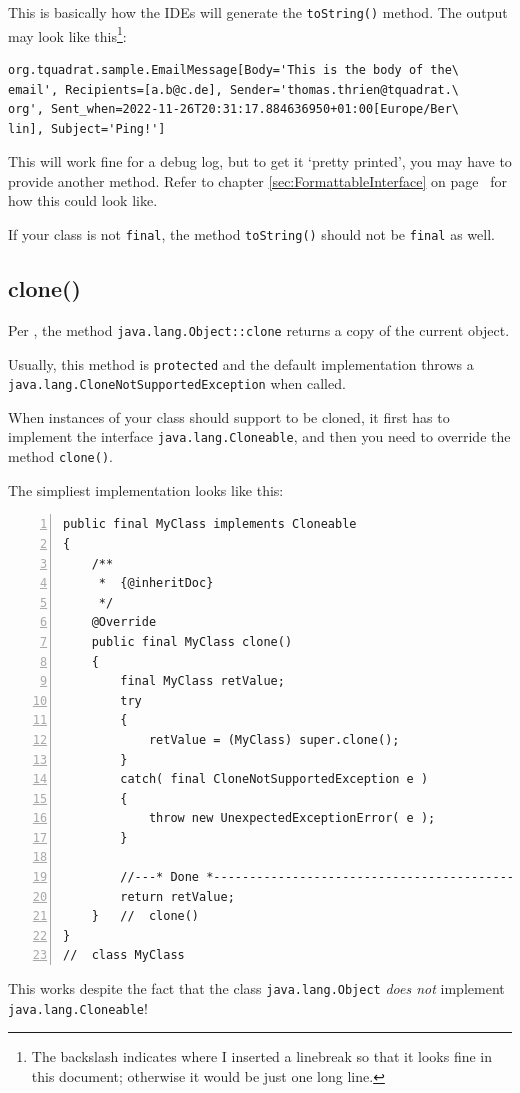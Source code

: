 \documentclass[11pt,a4paper, titlepage, parskip=half, headsepline, footsepline, cleardoublepage=current, headheight=1cm]{scrbook}
\newcommand*{\tqvref}[1]{\hyperref[{#1}]{\ref*{#1}} on page~\pageref{#1}}
\begin{document}
This is basically how the IDEs will generate the \lstinline|toString()| method. The output may look like this\footnote{The backslash indicates where I inserted a linebreak so that it looks fine in this document; otherwise it would be just one long line.}:
\begin{verbatim}
org.tquadrat.sample.EmailMessage[Body='This is the body of the\
email', Recipients=[a.b@c.de], Sender='thomas.thrien@tquadrat.\
org', Sent_when=2022-11-26T20:31:17.884636950+01:00[Europe/Ber\
lin], Subject='Ping!']
\end{verbatim}

This will work fine for a debug log, but to get it ‘pretty printed’, you may have to provide another method. Refer to chapter \tqvref{sec:FormattableInterface} for how
this could look like.

If your class is not \lstinline|final|, the method \lstinline|toString()| should not be \lstinline|final| as well. 

\subsection{clone()}\label{sec:Clone}
Per \autocite{ORACLE_DOC_OBJECT:clone}, the method \lstinline|java.lang.Object::clone| returns a copy of the current object.

Usually, this method is \lstinline|protected| and the default implementation throws a \lstinline|java.lang.CloneNotSupportedException|\autocite{ORACLE_DOC_CLONENOTSUPPORTEDEXCEPTION_CLASS} when called.

When instances of your class should support to be cloned, it first has to implement the interface \lstinline|java.lang.Cloneable|\autocite{ORACLE_DOC_CLONEABLE_INTERFACE}, and then you need to override the method \lstinline|clone()|.

The simpliest implementation looks like this:
\begin{lstlisting}[numbers=left,caption={A simple clone() Method}]
public final MyClass implements Cloneable
{
    /**
     *  {@inheritDoc}
     */
    @Override
    public final MyClass clone()
    {
        final MyClass retValue;
        try
        {
            retValue = (MyClass) super.clone();
        }    
        catch( final CloneNotSupportedException e )
        {
            throw new UnexpectedExceptionError( e );
        }
        
        //---* Done *------------------------------------------------
        return retValue;
    }   //  clone() 
}
//  class MyClass
\end{lstlisting}
This works despite the fact that the class \lstinline|java.lang.Object| \textit{does not} implement \lstinline|java.lang.Cloneable|!
\end{document}
